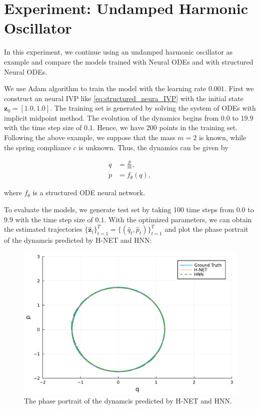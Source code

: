 \documentclass[
	parskip, 			   %
	twoside, 			   %
	DIV=14, 			   %
	BCOR=15.0mm, 		   %
	headsepline, 		   %
	open=right, 		   %
	captions=tableheading, %
	bibliography=totoc,    %
	numbers=noenddot       %
]{scrreprt}
\begin{document}
\section{Experiment: Undamped Harmonic Oscillator}
In this experiment, we continue using an undamped harmonic oscillator as example and compare the models trained with Neural ODEs and with structured Neural ODEs.

We use Adam algorithm to train the model with the learning rate $0.001$. First we construct an neural IVP like \ref{eq:structured_neura_IVP} with the initial state $\mathbf{z}_0 = [1.0, 1.0]$. The training set is generated by solving the system of ODEs with implicit midpoint method. The evolution of the dynamics begins from $0.0$ to $19.9$ with the time step size of $0.1$. Hence, we have 200 points in the training set. Following the above example, we suppose that the mass $m=2$ is known, while the spring compliance $c$ is unknown. Thus, the dynamics can be given by

\begin{equation}
    \label{eq:NeuralODE_udho}
    \begin{aligned}
        \dot{q}&=\frac{p}{m},\\
        \dot{p}&=f_{\theta}(q),
    \end{aligned}
\end{equation}

where $f_{\theta}$ is a structured ODE neural network.

To evaluate the models, we generate test set by taking 100 time steps from $0.0$ to $9.9$ with the time step size of $0.1$. With the optimized parameters, we can obtain the estimated trajectories $\{ \mathbf{\hat{z}}_{t} \}_{t=1}^{T} = \{ (\hat{q}_{t}, \hat{p}_{t}) \}_{t=1}^{T}$ and plot the phase portrait of the dynamcis predicted by H-NET and HNN:

\begin{figure}[h!]
    \centering
    \includegraphics[scale=0.5]{figures/phase_portrait_H_NET_and_HNN.pdf}
    \caption{The phase portrait of the dynamcis predicted by H-NET and HNN.}
    \label{fig:phase_portrait_H_NET_and_HNN}
\end{figure}
\end{document}

